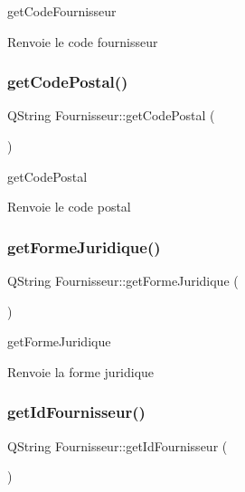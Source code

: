 get\+Code\+Fournisseur 

\begin{DoxyReturn}{Renvoie}
le code fournisseur 
\end{DoxyReturn}
\mbox{\label{class_fournisseur_ab8daa4a60b7a40af956e40492ed249b8}} 
\subsubsection{\texorpdfstring{get\+Code\+Postal()}{getCodePostal()}}
{\footnotesize\ttfamily Q\+String Fournisseur\+::get\+Code\+Postal (\begin{DoxyParamCaption}{ }\end{DoxyParamCaption})}



get\+Code\+Postal 

\begin{DoxyReturn}{Renvoie}
le code postal 
\end{DoxyReturn}
\mbox{\label{class_fournisseur_a5676a3819da9e28dbfc67f26f82ac9f5}} 
\subsubsection{\texorpdfstring{get\+Forme\+Juridique()}{getFormeJuridique()}}
{\footnotesize\ttfamily Q\+String Fournisseur\+::get\+Forme\+Juridique (\begin{DoxyParamCaption}{ }\end{DoxyParamCaption})}



get\+Forme\+Juridique 

\begin{DoxyReturn}{Renvoie}
la forme juridique 
\end{DoxyReturn}
\mbox{\label{class_fournisseur_ae7ccf2a255b2ce31d88703dc5c28798d}} 
\subsubsection{\texorpdfstring{get\+Id\+Fournisseur()}{getIdFournisseur()}}
{\footnotesize\ttfamily Q\+String Fournisseur\+::get\+Id\+Fournisseur (\begin{DoxyParamCaption}{ }\end{DoxyParamCaption})}




